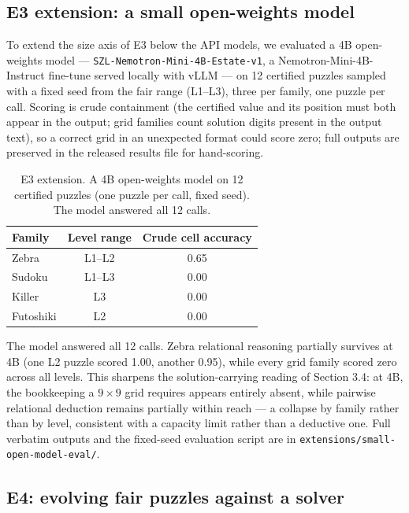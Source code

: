 \subsection{E3 extension: a small open-weights model}
\label{sec:smallmodel}

To extend the size axis of E3 below the API models, we evaluated a 4B
open-weights model --- \texttt{SZL-Nemotron-Mini-4B-Estate-v1}, a
Nemotron-Mini-4B-Instruct fine-tune served locally with vLLM --- on 12
certified puzzles sampled with a fixed seed from the fair range (L1--L3),
three per family, one puzzle per call. Scoring is crude containment (the
certified value and its position must both appear in the output; grid
families count solution digits present in the output text), so a correct
grid in an unexpected format could score zero; full outputs are preserved
in the released results file for hand-scoring.

\begin{table}[h]
\centering
\begin{tabular}{lcc}
\toprule
Family & Level range & Crude cell accuracy \\
\midrule
Zebra & L1--L2 & 0.65 \\
Sudoku & L1--L3 & 0.00 \\
Killer & L3 & 0.00 \\
Futoshiki & L2 & 0.00 \\
\bottomrule
\end{tabular}
\caption{E3 extension. A 4B open-weights model on 12 certified puzzles
(one puzzle per call, fixed seed). The model answered all 12 calls.}
\label{tab:smallmodel}
\end{table}

The model answered all 12 calls. Zebra relational reasoning partially
survives at 4B (one L2 puzzle scored 1.00, another 0.95), while every
grid family scored zero across all levels. This sharpens the
solution-carrying reading of Section 3.4: at 4B, the bookkeeping a
$9{\times}9$ grid requires appears entirely absent, while pairwise
relational deduction remains partially within reach --- a collapse by
family rather than by level, consistent with a capacity limit rather
than a deductive one. Full verbatim outputs and the fixed-seed
evaluation script are in \texttt{extensions/small-open-model-eval/}.

\subsection{E4: evolving fair puzzles against a solver}

